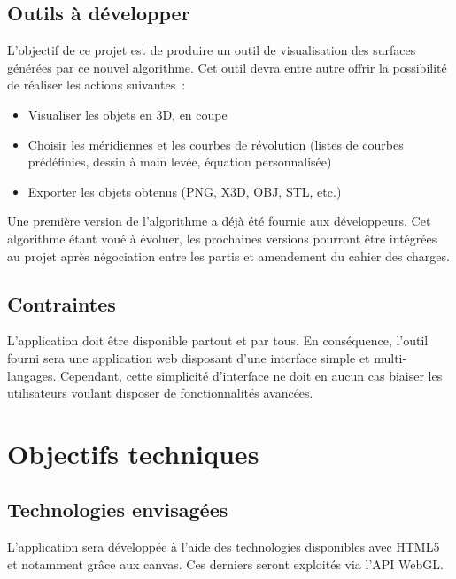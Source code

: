 \documentclass{scrartcl}
\begin{document}
	\subsection{Outils à développer}
		L'objectif de ce projet est de produire un outil de visualisation des surfaces générées par ce nouvel algorithme. Cet outil devra entre autre offrir la possibilité de réaliser les actions suivantes~:
		\begin{itemize}
			\item Visualiser les objets en 3D, en coupe
			\item Choisir les méridiennes et les courbes de révolution (listes de courbes prédéfinies, dessin à main levée, équation personnalisée)
	 		\item Exporter les objets obtenus (PNG, X3D, OBJ, STL, etc.)
		\end{itemize}
		
		Une première version de l'algorithme a déjà été fournie aux développeurs. Cet algorithme étant voué à évoluer, les prochaines versions pourront être intégrées au projet après négociation entre les partis et amendement du cahier des charges.

	\subsection{Contraintes}
		L'application doit être disponible partout et par tous. En conséquence, l'outil fourni sera une application web disposant d'une interface simple et multi-langages. Cependant, cette simplicité d'interface ne doit en aucun cas biaiser les utilisateurs voulant disposer de fonctionnalités avancées.




\section{Objectifs techniques}

	\subsection{Technologies envisagées}
		L'application sera développée à l'aide des technologies disponibles avec HTML5 et notamment grâce aux canvas. Ces derniers seront exploités via l'API WebGL.
\end{document}

